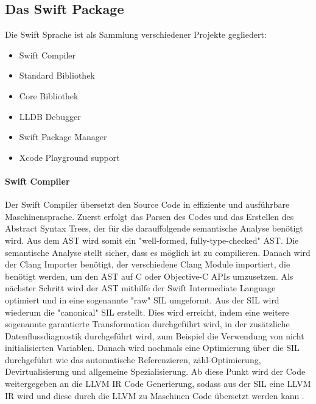 \subsection{Das Swift Package}
\label{sec: dasswiftpackage}
Die Swift Sprache ist als Sammlung verschiedener Projekte gegliedert:
\begin{itemize}
\item Swift Compiler
\item Standard Bibliothek 
\item Core Bibliothek
\item LLDB Debugger
\item Swift Package Manager
\item Xcode Playground support
\end{itemize}

\paragraph{Swift Compiler}
Der Swift Compiler übersetzt den Source Code in effiziente und ausführbare Maschinensprache. Zuerst erfolgt das Parsen des Codes und das Erstellen des Abstract Syntax Trees, der für die darauffolgende semantische Analyse benötigt wird. Aus dem AST wird somit ein "well-formed, fully-type-checked" AST. Die semantische Analyse stellt sicher, dass es möglich ist zu compilieren.  Danach wird der Clang Importer benötigt, der verschiedene Clang Module importiert, die benötigt werden, um den AST auf C oder Objective-C APIs umzusetzen. Als nächster Schritt wird der AST mithilfe der Swift Intermediate Language optimiert und in eine sogenannte "raw" SIL umgeformt. Aus der SIL wird wiederum die "canonical" SIL erstellt. Dies wird erreicht, indem eine weitere sogenannte garantierte Transformation durchgeführt wird, in der zusätzliche Datenflussdiagnostik durchgeführt wird, zum Beispiel die Verwendung von nicht initialisierten Variablen. Danach wird nochmals eine Optimierung über die SIL durchgeführt wie das automatische Referenzieren, zähl-Optimierung, Devirtualisierung und allgemeine Spezialisierung. Ab diese Punkt wird der Code weitergegeben an die LLVM IR Code Generierung, sodass aus der SIL eine LLVM IR wird und diese durch die LLVM zu Maschinen Code übersetzt werden kann \parencite{swiftcompiler}. 

